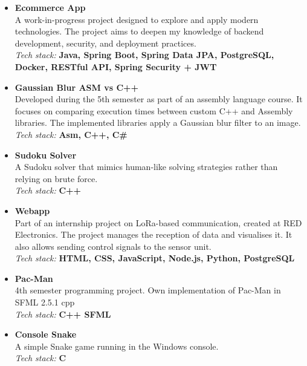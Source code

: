 \documentclass[11pt,letterpaper]{article}
\begin{document}
\begin{itemize}[leftmargin=0.5cm]
  \setlength\itemsep{0.4em}
      \item \textbf{Ecommerce App} \\
      A work-in-progress project designed to explore and apply modern technologies. 
      The project aims to deepen my knowledge of backend development, security, and deployment practices.\\ [.4em]
      \textit{Tech stack:} \textbf{Java, Spring Boot, Spring Data JPA, PostgreSQL,  Docker, RESTful API, Spring Security + JWT}
      
      \item \textbf{Gaussian Blur ASM vs C++} \\
      Developed during the 5th semester as part of an assembly language course.
      It focuses on comparing execution times between custom C++ and Assembly libraries.
      The implemented libraries apply a Gaussian blur filter to an image.\\ [.3em]
      \textit{Tech stack:} \textbf{Asm, C++, C\#}

      \item \textbf{Sudoku Solver} \\
      A Sudoku solver that mimics human-like solving strategies rather than relying on brute force. \\ [.3em]
      \textit{Tech stack:} \textbf{C++}
      
      \item \textbf{Webapp} \\
      Part of an internship project on LoRa-based communication, created at RED Electronics. 
      The project manages the reception of data and visualises it. It also allows sending control signals to the sensor unit. \\ [.3em]
      \textit{Tech stack:} \textbf{HTML, CSS, JavaScript, Node.js, Python, PostgreSQL}

      \item \textbf{Pac-Man} \\
      4th semester programming project. Own implementation of Pac-Man in SFML 2.5.1 cpp \\ [.3em]
      \textit{Tech stack:} \textbf{C++ SFML}

      \item \textbf{Console Snake} \\
      A simple Snake game running in the Windows console.  \\ [.3em]
      \textit{Tech stack:} \textbf{C}
\end{itemize}
\end{document}
